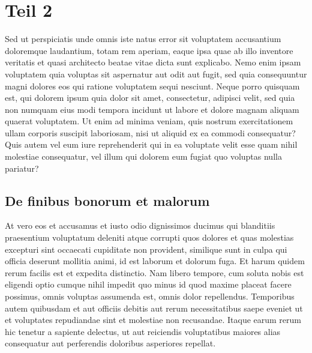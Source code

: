 %
%
%
%
\section{Teil 2 
\label{turing:section:teil2}}
Sed ut perspiciatis unde omnis iste natus error sit voluptatem
accusantium doloremque laudantium, totam rem aperiam, eaque ipsa
quae ab illo inventore veritatis et quasi architecto beatae vitae
dicta sunt explicabo. Nemo enim ipsam voluptatem quia voluptas sit
aspernatur aut odit aut fugit, sed quia consequuntur magni dolores
eos qui ratione voluptatem sequi nesciunt. Neque porro quisquam
est, qui dolorem ipsum quia dolor sit amet, consectetur, adipisci
velit, sed quia non numquam eius modi tempora incidunt ut labore
et dolore magnam aliquam quaerat voluptatem. Ut enim ad minima
veniam, quis nostrum exercitationem ullam corporis suscipit laboriosam,
nisi ut aliquid ex ea commodi consequatur? Quis autem vel eum iure
reprehenderit qui in ea voluptate velit esse quam nihil molestiae
consequatur, vel illum qui dolorem eum fugiat quo voluptas nulla
pariatur?

\subsection{De finibus bonorum et malorum
\label{turing:subsection:bonorum}}
At vero eos et accusamus et iusto odio dignissimos ducimus qui
blanditiis praesentium voluptatum deleniti atque corrupti quos
dolores et quas molestias excepturi sint occaecati cupiditate non
provident, similique sunt in culpa qui officia deserunt mollitia
animi, id est laborum et dolorum fuga. Et harum quidem rerum facilis
est et expedita distinctio. Nam libero tempore, cum soluta nobis
est eligendi optio cumque nihil impedit quo minus id quod maxime
placeat facere possimus, omnis voluptas assumenda est, omnis dolor
repellendus. Temporibus autem quibusdam et aut officiis debitis aut
rerum necessitatibus saepe eveniet ut et voluptates repudiandae
sint et molestiae non recusandae. Itaque earum rerum hic tenetur a
sapiente delectus, ut aut reiciendis voluptatibus maiores alias
consequatur aut perferendis doloribus asperiores repellat.


